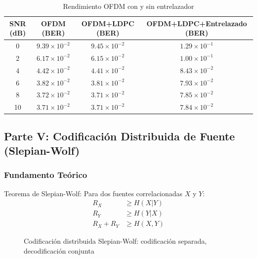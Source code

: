 \documentclass[12pt, a4paper]{article}
\begin{document}
\begin{table}[h]
\centering
\caption{Rendimiento OFDM con y sin entrelazador}
\label{tab:ofdm_es}
\begin{tabular}{c|c|c|c}
\toprule
SNR (dB) & OFDM (BER) & OFDM+LDPC (BER) & OFDM+LDPC+Entrelazado (BER) \\
\midrule
 0 & $9.39\times10^{-2}$ & $9.45\times10^{-2}$ & $1.29\times10^{-1}$ \\
 2 & $6.17\times10^{-2}$ & $6.15\times10^{-2}$ & $1.00\times10^{-1}$ \\
 4 & $4.42\times10^{-2}$ & $4.41\times10^{-2}$ & $8.43\times10^{-2}$ \\
 6 & $3.82\times10^{-2}$ & $3.81\times10^{-2}$ & $7.93\times10^{-2}$ \\
 8 & $3.72\times10^{-2}$ & $3.71\times10^{-2}$ & $7.85\times10^{-2}$ \\
10 & $3.71\times10^{-2}$ & $3.71\times10^{-2}$ & $7.84\times10^{-2}$ \\
\bottomrule
\end{tabular}
\end{table}

\subsection{Parte V: Codificaci\'on Distribuida de Fuente (Slepian-Wolf)}

\subsubsection{Fundamento Te\'orico}

Teorema de Slepian-Wolf: Para dos fuentes correlacionadas $X$ y $Y$:
\begin{align}
R_X &\geq H(X|Y) \label{eq:sw1_es}\\
R_Y &\geq H(Y|X) \label{eq:sw2_es}\\
R_X + R_Y &\geq H(X,Y) \label{eq:sw3_es}
\end{align}

\begin{figure}[h]
\centering
{}
\caption{Codificaci\'on distribuida Slepian-Wolf: codificaci\'on separada, decodificaci\'on conjunta}
\label{fig:sw_arch_es}
\end{figure}
\end{document}
